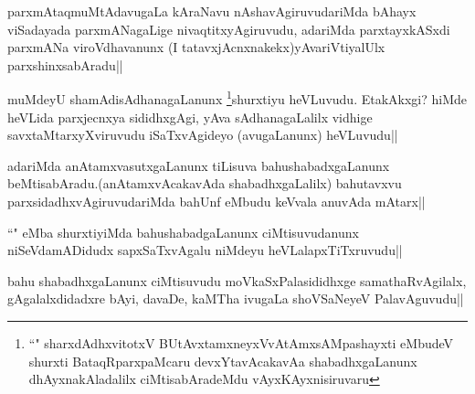 
\begin{artha}
parxmAtaqmuMtAdavugaLa kAraNavu nAshavAgiruvudariMda bAhayx viSadayada parxmANagaLige nivaqtitxyAgiruvudu, adariMda parxtayxkASxdi parxmANa viroVdhavanunx (I tatavxjAcnxnakekx)yAvariVtiyalUlx parxshinxsabAradu||
\end{artha}

\begin{artha}
muMdeyU shamAdisAdhanagaLanunx \footnote{``\stext" sharxdAdhxvitotxV BUtAvx\s\s tamxneyxVvA\s\s tAmxsAMpashayxti eMbudeV shurxti BataqRparxpaMcaru devxYtavAcakavAa shabadhxgaLanunx dhAyxnakAladalilx ciMtisabAradeMdu vAyxKAyxnisiruvaru}shurxtiyu heVLuvudu. EtakAkxgi? hiMde heVLida parxjecnxya sididhxgAgi, yAva sAdhanagaLalilx vidhige savxtaMtarxyXviruvudu iSaTxvAgideyo (avugaLanunx) heVLuvudu||
\end{artha}


\begin{artha}
adariMda anAtamxvasutxgaLanunx tiLisuva bahushabadxgaLanunx beMtisabAradu.(anAtamxvAcakavAda shabadhxgaLalilx) bahutavxvu parxsidadhxvAgiruvudariMda bahUnf eMbudu keVvala anuvAda mAtarx||
\end{artha}

\begin{artha}
``\stext" eMba shurxtiyiMda bahushabadgaLanunx ciMtisuvudanunx niSeVdamADidudx sapxSaTxvAgalu niMdeyu heVLalapxTiTxruvudu||
\end{artha}


\begin{artha}
bahu shabadhxgaLanunx ciMtisuvudu moVkaSxPalasididhxge samathaRvAgilalx, gAgalalxdidadxre bAyi, davaDe, kaMTha ivugaLa shoVSaNeyeV PalavAguvudu||
\end{artha}


